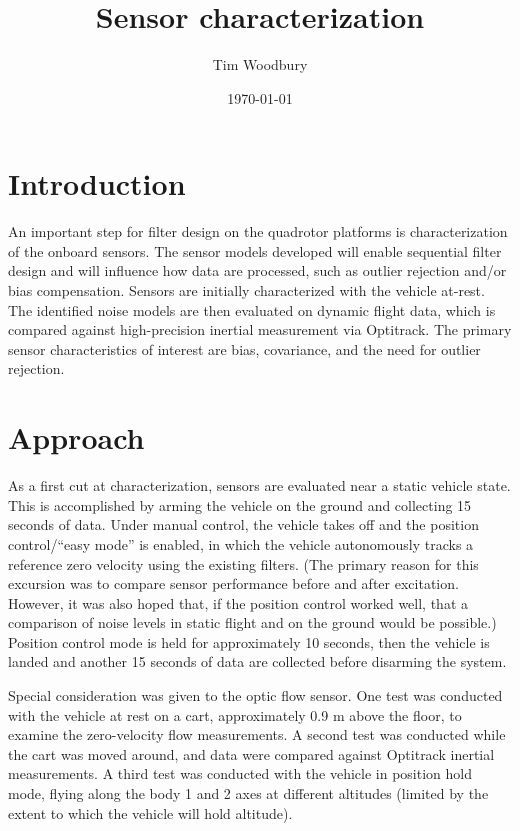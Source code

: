 \documentclass{article}
\title{Sensor characterization}
\author{Tim Woodbury}
\date{\today} %
\begin{document}
\maketitle

\section{Introduction}

An important step for filter design on the quadrotor platforms is characterization of the onboard sensors. The sensor models developed will enable sequential filter design and will influence how data are processed, such as outlier rejection and/or bias compensation. Sensors are initially characterized with the vehicle at-rest. The identified noise models are then evaluated on dynamic flight data, which is compared against high-precision inertial measurement via Optitrack. The primary sensor characteristics of interest are bias, covariance, and the need for outlier rejection.

\section{Approach}

As a first cut at characterization, sensors are evaluated near a static vehicle state. This is accomplished by arming the vehicle on the ground and collecting 15 seconds of data. Under manual control, the vehicle takes off and the position control/``easy mode'' is enabled, in which the vehicle autonomously tracks a reference zero velocity using the existing filters. (The primary reason for this excursion was to compare sensor performance before and after excitation. However, it was also hoped that, if the position control worked well, that a comparison of noise levels in static flight and on the ground would be possible.) Position control mode is held for approximately 10 seconds, then the vehicle is landed and another 15 seconds of data are collected before disarming the system.


Special consideration was given to the optic flow sensor. One test was conducted with the vehicle at rest on a cart, approximately 0.9 m above the floor, to examine the zero-velocity flow measurements. A second test was conducted while the cart was moved around, and data were compared against Optitrack inertial measurements. A third test was conducted with the vehicle in position hold mode, flying along the body 1 and 2 axes at different altitudes (limited by the extent to which the vehicle will hold altitude).
\end{document}
